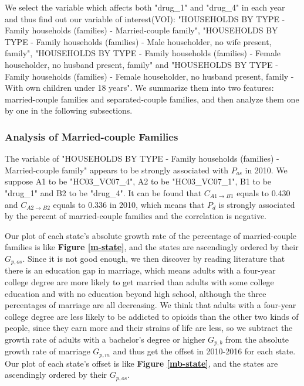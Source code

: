 \documentclass[12pt]{article}
\begin{document}
We select the variable which affects both "drug\_1" and "drug\_4" in each year and thus find out our variable of interest(VOI): "HOUSEHOLDS BY TYPE - Family households (families) - Married-couple family", "HOUSEHOLDS BY TYPE - Family households (families) - Male householder, no wife present, family", "HOUSEHOLDS BY TYPE - Family households (families) - Female householder, no husband present, family" and "HOUSEHOLDS BY TYPE - Family households (families) - Female householder, no husband present, family - With own children under 18 years". We summarize them into two features: married-couple families and separated-couple families, and then analyze them one by one in the following subsections.

\subsubsection{Analysis of Married-couple Families}
The variable of "HOUSEHOLDS BY TYPE - Family households (families) - Married-couple family" appears to be strongly associated with $P_{os}$ in 2010. We suppose A1 to be "HC03\_VC07\_4", A2 to be "HC03\_VC07\_1", B1 to be "drug\_1" and B2 to be "drug\_4". It can be found that $C_{A1 \to B1}$ equals to 0.430 and $C_{A2 \to B2}$ equals to 0.336 in 2010, which means that $P_d$ is strongly associated by the percent of married-couple families and the correlation is negative. 

Our plot of each state's absolute growth rate of the percentage of married-couple families is like \textbf{Figure \ref{m-state}}, and the states are ascendingly ordered by their $G_{p,os}$. Since it is not good enough, we then discover by reading literature that there is an education gap in marriage, which means adults with a four-year college degree are more likely to get married than adults with some college education and with no education beyond high school, although the three percentages of marriage are all decreasing.\cite{marriage} We think that adults with a four-year college degree are less likely to be addicted to opioids than the other two kinds of people, since they earn more and their strains of life are less, so we subtract the growth rate of adults with a bachelor's degree or higher $G_{p,b}$ from the absolute growth rate of marriage $G_{p,m}$ and thus get the offset in 2010-2016 for each state. Our plot of each state's offset is like \textbf{Figure \ref{mb-state}}, and the states are ascendingly ordered by their $G_{p,os}$. 
\end{document}
